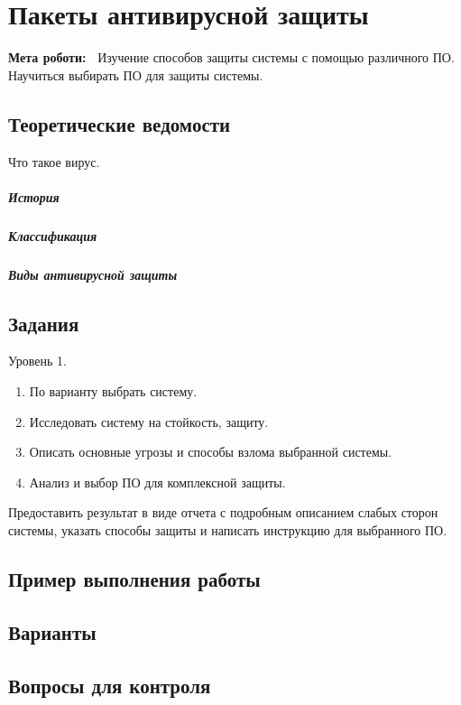 \chapter{Пакеты антивирусной защиты} \label{chapt6}%
\textbf{Мета роботи:~}%
Изучение способов защиты системы с помощью различного ПО. Научиться выбирать
ПО для защиты системы.
\section{Теоретические ведомости} \label{sect6_a}
Что такое вирус.

\paragraph{История}

\paragraph{Классификация}

\paragraph{Виды антивирусной защиты}

\section{Задания}\label{sect6_b}
%
Уровень 1.
\begin{enumerate}
  \item По варианту выбрать систему.
  \item Исследовать систему на стойкость, защиту.
  \item Описать основные угрозы и способы взлома выбранной системы.
  \item Анализ и выбор ПО для комплексной защиты.
\end{enumerate}
Предоставить результат в виде отчета с подробным описанием слабых сторон
системы, указать способы защиты и написать инструкцию для выбранного ПО.
\section{Пример выполнения работы}\label{sect6_c}
%
\section{Варианты}\label{sect6_d}
%
\section{Вопросы для контроля}\label{sect6_e}
%
